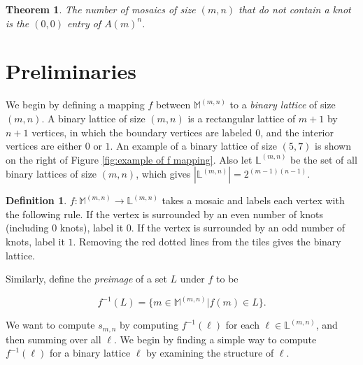 \documentclass[12pt]{article}
\theoremstyle{plain}
\newtheorem{thm}{Theorem}[section]
\theoremstyle{definition}
\newtheorem{definition}{Definition}[section]
\theoremstyle{remark}
\theoremstyle{definition}
\begin{document}
\begin{thm}
\label{thm: messy mosaics}
The number of mosaics of size $(m,n)$ that \textit{do not} contain a knot is the $(0,0)$ entry of $A(m)^n$.
\end{thm}

\section{Preliminaries}

We begin by defining a mapping $f$ between $\mathbb{M}^{(m,n)}$ to a \textit{binary lattice} of size $(m,n)$. A binary lattice of size $(m,n)$ is a rectangular lattice of $m+1$ by $n+1$ vertices, in which the boundary vertices are labeled $0$, and the interior vertices are either $0$ or $1$. An example of a binary lattice of size $(5,7)$ is shown on the right of Figure \ref{fig:example of f mapping}. Also let $\mathbb{L}^{(m,n)}$ be the set of all binary lattices of size $(m,n)$, which gives $\left|\mathbb{L}^{(m,n)}\right| = 2^{(m-1)(n-1)}$. 

\begin{definition}

$f: \mathbb{M}^{(m,n)} \to \mathbb{L}^{(m,n)}$ takes a mosaic and labels each vertex with the following rule. If the vertex is surrounded by an even number of knots (including $0$ knots), label it $0$. If the vertex is surrounded by an odd number of knots, label it $1$. Removing the red dotted lines from the tiles gives the binary lattice. 
    
\end{definition}

Similarly, define the \textit{preimage} of a set $L$ under $f$ to be

$$f^{-1}(L) = \{m \in \mathbb{M}^{(m,n)} | f(m) \in L\}.$$

We want to compute $s_{m,n}$ by computing $f^{-1}(\ell)$ for each $\ell \in \mathbb{L}^{(m,n)}$, and then summing over all $\ell$. We begin by finding a simple way to compute $f^{-1}(\ell)$ for a binary lattice $\ell$ by examining the structure of $\ell$.
\end{document}

